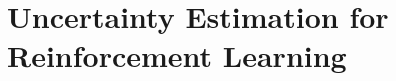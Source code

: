 \chapter{Uncertainty Estimation for Reinforcement Learning}
\label{chap:reinforcement_learning}










